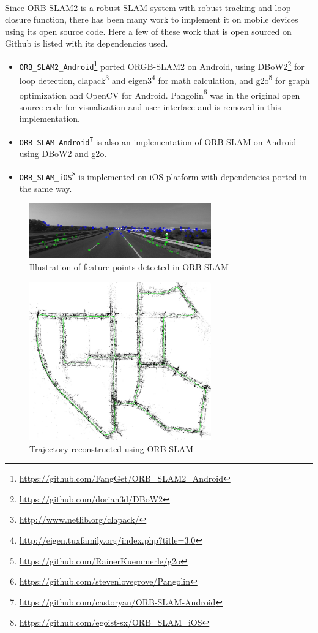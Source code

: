 \documentclass[12pt,twoside]{article}
\begin{document}
\\
Since ORB-SLAM2 is a robust SLAM system with robust tracking and loop closure function, there has been many work to implement it on mobile devices using its open source code. Here a few of these work that is open sourced on Github is listed with its dependencies used.
\begin{itemize}
   \item \verb|ORB_SLAM2_Android|\footnote{\url{https://github.com/FangGet/ORB_SLAM2_Android}} ported ORGB-SLAM2 on Android, using DBoW2\footnote{\url{https://github.com/dorian3d/DBoW2}} for loop detection, clapack\footnote{\url{http://www.netlib.org/clapack/}} and eigen3\footnote{\url{http://eigen.tuxfamily.org/index.php?title=3.0}} for math calculation, and g2o\footnote{\url{https://github.com/RainerKuemmerle/g2o}} for graph optimization and OpenCV for Android. Pangolin\footnote{\url{https://github.com/stevenlovegrove/Pangolin}} was in the original open source code for visualization and user interface and is removed in this implementation.
   \item \verb|ORB-SLAM-Android|\footnote{\url{https://github.com/castoryan/ORB-SLAM-Android}} is also an implementation of ORB-SLAM on Android using DBoW2 and g2o.
   \item \verb|ORB_SLAM_iOS|\footnote{\url{https://github.com/egoist-sx/ORB_SLAM_iOS}} is implemented on iOS platform with dependencies ported in the same way.
  \end{itemize}
\begin{figure}[h]
    \centering
    \includegraphics[width=0.7\textwidth]{figures/orb1}
    \caption{Illustration of feature points detected in ORB SLAM}
    \label{fig: orb1}
\end{figure}

\begin{figure}[h]
    \centering
    \includegraphics[width=0.7\textwidth]{figures/orb2}
    \caption{Trajectory reconstructed using ORB SLAM}
    \label{fig: orb2}
\end{figure}
\end{document}
